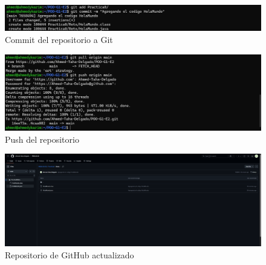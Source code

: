 \documentclass[letterpaper,12pt]{article}
\begin{document}
\begin{figure}[H]
    \centering
    \includegraphics[width=14cm]{commit.jpeg}
    \caption{Commit del repositorio a Git}
    \label{fig:java}
\end{figure}

\begin{figure}[H]
    \centering
    \includegraphics[width=14cm]{push.jpeg}
    \caption{Push del repositorio}
    \label{fig:java}
\end{figure}

\begin{figure}[H]
    \centering
    \includegraphics[width=14cm]{repo.png}
    \caption{Repositorio de GitHub actualizado}
    \label{fig:java}
\end{figure}
\end{document}

